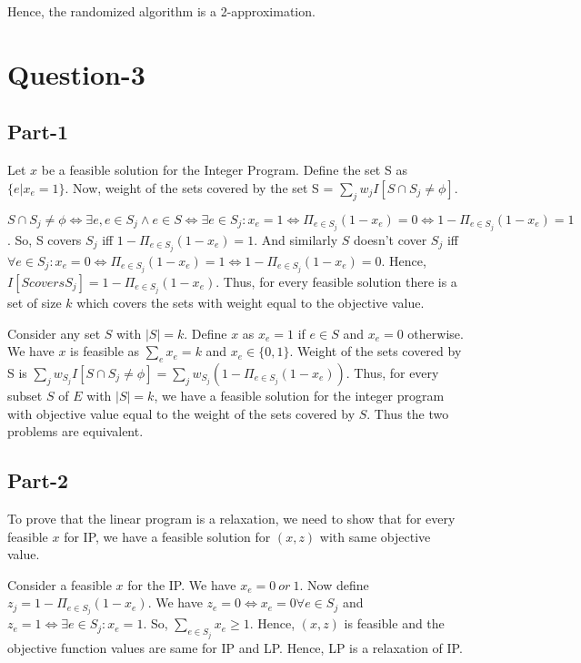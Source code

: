 \documentclass{article}
\newcommand{\set}[1]{\{#1\}}
\newcommand{\size}[1]{|#1|}
\begin{document}
Hence, the randomized algorithm is a 2-approximation.
\section{Question-3}
\subsection{Part-1}
Let $x$ be a feasible solution for the Integer Program. Define the set S as $\set{e | x_e = 1}$. Now, weight of the sets covered by the set S = $\sum_{j}w_jI[S \cap S_j \ne \phi]$. 

$S \cap S_j \ne \phi \iff \exists e, e \in S_j \land e \in S \iff \exists e \in S_j : x_e = 1 \iff \Pi_{e \in S_j}(1 - x_e) = 0 \iff 1 - \Pi_{e \in S_j}(1-x_e) = 1$.
So, S covers $S_j$ iff $1 - \Pi_{e \in S_j}(1 - x_e) = 1$. And similarly $S$ doesn't cover $S_j$ iff $\forall e \in S_j: x_e = 0 \iff \Pi_{e \in S_j}(1 - x_e) = 1 \iff 1 - \Pi_{e \in S_j}(1-x_e) = 0$. Hence, $I[S covers S_j] = 1 - \Pi_{e \in S_j}(1-x_e)$. Thus, for every feasible solution there is a set of size $k$ which covers the sets with weight equal to the objective value.

Consider any set $S$ with $\size{S} = k$. Define $x$ as $x_e = 1$ if $e \in S$ and $x_e = 0$ otherwise. We have $x$ is feasible as $\sum_{e}x_e = k$ and 
$x_e \in \set{0,1}$. Weight of the sets covered by S is $\sum_j{w_{S_j}}I[S \cap S_j \ne \phi] = \sum_jw_{S_j}(1 - \Pi_{e \in S_j}(1 - x_e))$. Thus, for every subset $S$ of $E$ with $\size{S} = k$, we have a feasible solution for the integer program with objective value equal to the weight of the sets covered by $S$. Thus the two problems are equivalent.
\subsection{Part-2}
To prove that the linear program is a relaxation, we need to show that for every feasible $x$ for IP, we have a feasible solution for $(x,z)$ with same objective value.

Consider a feasible $x$ for the IP. We have $x_e = 0 \ or\ 1$. Now define $z_j = 1 - \Pi_{e \in S_j}(1 - x_e)$. We have $z_e = 0 \iff x_e = 0 \forall e\in S_j$ and $z_e = 1 \iff \exists e \in S_j : x_e = 1$. So, $\sum_{e \in S_j}x_e \geq 1$. Hence, $(x,z)$ is feasible and the objective function values are same for IP and LP. Hence, LP is a relaxation of IP.
\end{document}
